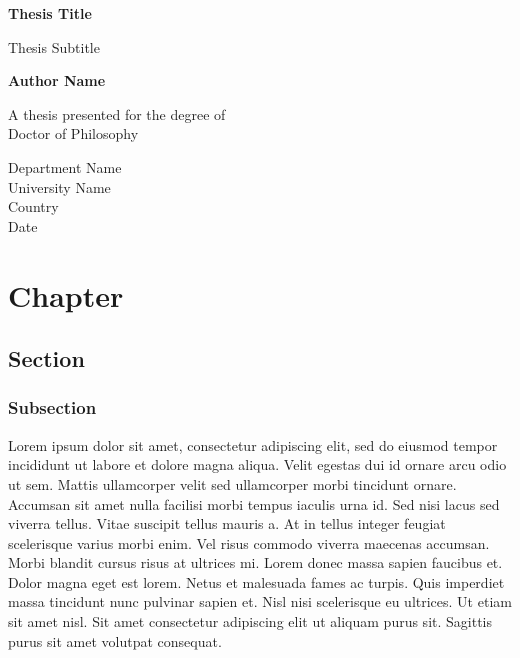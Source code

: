 \documentclass[draft]{G7-32-2017}
\begin{document}
\begin{titlepage}
    \begin{center}
        \vspace*{1cm}

        \textbf{Thesis Title}

        \vspace{0.5cm}
            Thesis Subtitle
                
        \vspace{1.5cm}

        \textbf{Author Name}

        \vfill
                
        A thesis presented for the degree of\\
        Doctor of Philosophy
                
        \vspace{0.8cm}
                
        Department Name\\
        University Name\\
        Country\\
        Date
    \end{center}
\end{titlepage}

\chapter{Chapter}

\section{Section}

\subsection{Subsection}

Lorem ipsum dolor sit amet, consectetur adipiscing elit, sed do eiusmod tempor incididunt ut labore et dolore magna aliqua. Velit egestas dui id ornare arcu odio ut sem. Mattis ullamcorper velit sed ullamcorper morbi tincidunt ornare. Accumsan sit amet nulla facilisi morbi tempus iaculis urna id. Sed nisi lacus sed viverra tellus. Vitae suscipit tellus mauris a. At in tellus integer feugiat scelerisque varius morbi enim. Vel risus commodo viverra maecenas accumsan. Morbi blandit cursus risus at ultrices mi. Lorem donec massa sapien faucibus et. Dolor magna eget est lorem. Netus et malesuada fames ac turpis. Quis imperdiet massa tincidunt nunc pulvinar sapien et. Nisl nisi scelerisque eu ultrices. Ut etiam sit amet nisl. Sit amet consectetur adipiscing elit ut aliquam purus sit. Sagittis purus sit amet volutpat consequat.
\end{document}
